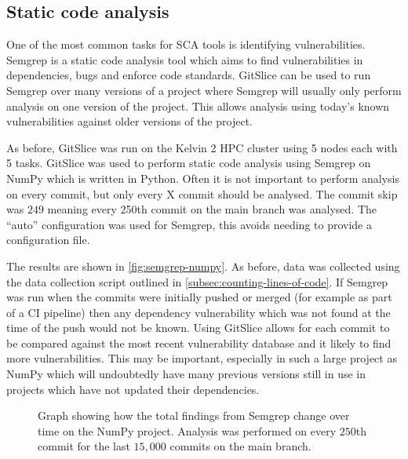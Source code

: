 \subsection{Static code analysis}
\label{subsec:static-code-analysis}

One of the most common tasks for SCA tools is identifying vulnerabilities.
Semgrep is a static code analysis tool which aims to find vulnerabilities in dependencies, bugs and enforce code standards.
GitSlice can be used to run Semgrep over many versions of a project where Semgrep will usually only perform analysis on one version of the project.
This allows analysis using today's known vulnerabilities against older versions of the project.

As before, GitSlice was run on the Kelvin 2 HPC cluster using 5 nodes each with 5 tasks.
GitSlice was used to perform static code analysis using Semgrep on NumPy which is written in Python.
Often it is not important to perform analysis on every commit, but only every X commit should be analysed.
The commit skip was $ 249 $ meaning every 250th commit on the main branch was analysed.
The ``auto'' configuration was used for Semgrep, this avoids needing to provide a configuration file.

The results are shown in \autoref{fig:semgrep-numpy}.
As before, data was collected using the data collection script outlined in \autoref{subsec:counting-lines-of-code}.
If Semgrep was run when the commits were initially pushed or merged (for example as part of a CI pipeline) then any dependency vulnerability which was not found at the time of the push would not be known.
Using GitSlice allows for each commit to be compared against the most recent vulnerability database and it likely to find more vulnerabilities.
This may be important, especially in such a large project as NumPy which will undoubtedly have many previous versions still in use in projects which have not updated their dependencies.

\begin{figure}
    \centering
    \caption{Graph showing how the total findings from Semgrep change over time on the NumPy project.  Analysis was performed on every $250$th commit for the last $15,000$ commits on the main branch.}
    \label{fig:semgrep-numpy}
\end{figure}

